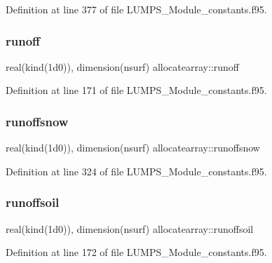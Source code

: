 Definition at line 377 of file L\+U\+M\+P\+S\+\_\+\+Module\+\_\+constants.\+f95.

\mbox{\label{namespaceallocatearray_abf84199761d02e1a9304d1d7a2c00eba}} 
\subsubsection{\texorpdfstring{runoff}{runoff}}
{\footnotesize\ttfamily real(kind(1d0)), dimension(nsurf) allocatearray\+::runoff}



Definition at line 171 of file L\+U\+M\+P\+S\+\_\+\+Module\+\_\+constants.\+f95.

\mbox{\label{namespaceallocatearray_ad99e95bac5bad1e8fd7ae73daf74933e}} 
\subsubsection{\texorpdfstring{runoffsnow}{runoffsnow}}
{\footnotesize\ttfamily real(kind(1d0)), dimension(nsurf) allocatearray\+::runoffsnow}



Definition at line 324 of file L\+U\+M\+P\+S\+\_\+\+Module\+\_\+constants.\+f95.

\mbox{\label{namespaceallocatearray_a56dec28d9173b960574b82696b82f7a2}} 
\subsubsection{\texorpdfstring{runoffsoil}{runoffsoil}}
{\footnotesize\ttfamily real(kind(1d0)), dimension(nsurf) allocatearray\+::runoffsoil}



Definition at line 172 of file L\+U\+M\+P\+S\+\_\+\+Module\+\_\+constants.\+f95.

\mbox{\label{namespaceallocatearray_a7a8427e580d0969440e13673f28c5104}} 
